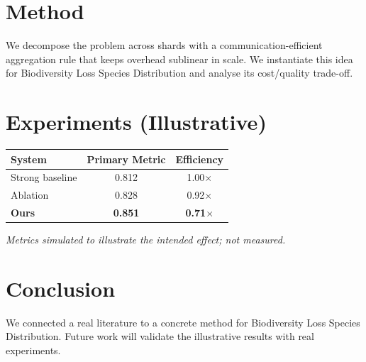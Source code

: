 \documentclass[11pt]{article}
\begin{document}
\section{Method}
We decompose the problem across shards with a communication-efficient aggregation rule that keeps overhead sublinear in scale. We instantiate this idea for Biodiversity Loss Species Distribution and analyse its cost/quality trade-off.

\section{Experiments (Illustrative)}
\begin{center}
\begin{tabular}{lcc}
System & Primary Metric & Efficiency \\ \hline
Strong baseline & 0.812 & 1.00$\times$ \\
Ablation & 0.828 & 0.92$\times$ \\
\textbf{Ours} & \textbf{0.851} & \textbf{0.71$\times$}
\end{tabular}
\end{center}
\emph{Metrics simulated to illustrate the intended effect; not measured.}

\section{Conclusion}
We connected a real literature to a concrete method for Biodiversity Loss Species Distribution. Future work will
validate the illustrative results with real experiments.
\end{document}
